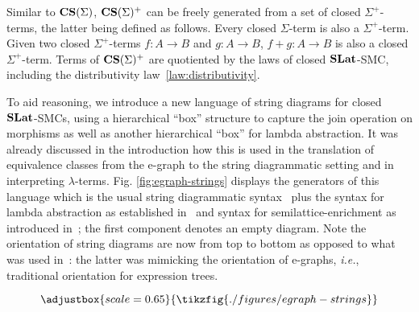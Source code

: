 Similar to $\mathbf{CS}(\Sigma)$, $\mathbf{CS}(\Sigma)^{+}$ can be freely generated from a set of closed $\Sigma^{+}$-terms, the latter being defined as follows.
Every closed $\Sigma$-term is also a $\Sigma^{+}$-term. 
Given two closed $\Sigma^{+}$-terms $f : A \to B$ and $g : A \to B$, $f + g : A \to B$ is also a closed $\Sigma^{+}$-term.
Terms of $\mathbf{CS}(\Sigma)^{+}$ are quotiented by the laws of closed $\mathbf{SLat}$-SMC, including the distributivity law~\ref{law:distributivity}.


To aid reasoning, we introduce a new language of string diagrams for closed $\mathbf{SLat}$-SMCs, using a hierarchical ``box'' structure to capture the join operation on morphisms as well as another hierarchical ``box'' for lambda abstraction.
It was already discussed in the introduction how this is  used in the translation of equivalence classes from the e-graph to the string diagrammatic setting and in interpreting $\lambda$-terms.
Fig. \ref{fig:egraph-strings} displays the generators of this language which is the usual string diagrammatic syntax~\cite{Selinger_2010} plus the syntax for lambda abstraction as established in~\cite{ghica2024stringdiagramslambdacalculifunctional} and syntax for semilattice-enrichment as introduced in~\cite{ghica2024equivalencehypergraphsegraphsmonoidal}; the first component denotes an empty diagram.
Note the orientation of string diagrams are now from top to bottom as opposed to what was used in~: the latter was mimicking the orientation of e-graphs, \textit{i.e.}, traditional orientation for expression trees.


\begin{figure*}
\[
\adjustbox{scale=0.65}{
\tikzfig{./figures/egraph-strings}
}
\]
\captionsetup{skip=0pt, belowskip=-2ex}
\caption{String diagrams for closed semilattice-enriched symmetric monoidal categories.}
\label{fig:egraph-strings}
\end{figure*}